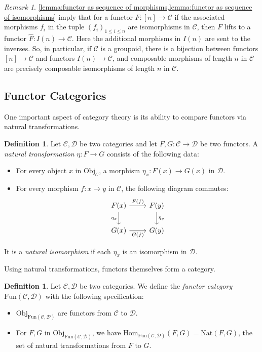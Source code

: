 \documentclass[11pt, a4paper]{amsart}
\newcommand{\cC}{\mathcal{C}}
\newcommand{\cD}{\mathcal{D}}
\newcommand{\Hom}{\mathrm{Hom}}
\newcommand{\Fun}{\mathrm{Fun}}
\newcommand{\Nat}{\mathrm{Nat}}
\newcommand{\Obj}{\mathrm{Obj}}
\theoremstyle{definition}
\newtheorem{definition}[equation]{Definition}
\theoremstyle{remark}
\newtheorem{remark}[equation]{Remark}
\numberwithin{equation}{section}
\begin{document}
\begin{remark} \label{rem:n to in lift}
  \cref{lemma:functor as sequence of morphisms,lemma:functor as sequence of isomorphisms} imply that for a functor $F\colon [n] \to \cC$ if the associated morphisms $f_i$ in the tuple $(f_i)_{1 \leq i \leq n}$ are isomorphisms in $\cC$, then $F$ lifts to a functor $\hat{F}\colon I(n) \to \cC$. Here the additional morphisms in $I(n)$ are sent to the inverses. 
  So, in particular, if $\cC$ is a groupoid, there is a bijection between functors $[n] \to \cC$ and functors $I(n) \to \cC$, and composable morphisms of length $n$ in $\cC$ are precisely composable isomorphisms of length $n$ in $\cC$.
\end{remark}

\subsection{Functor Categories}
One important aspect of category theory is its ability to compare functors via natural transformations.

\begin{definition}
	Let $\cC,\cD$ be two categories and let $F,G\colon \cC \to \cD$ be two functors. A \emph{natural transformation} $\eta\colon F \to G$ consists of the following data:
	\begin{itemize}
		\item For every object $x$ in $\Obj_{\cC}$, a morphism $\eta_x\colon F(x) \to G(x)$ in $\cD$.
		\item For every morphism $f\colon x \to y$ in $\cC$, the following diagram commutes:
		\[
		\begin{tikzcd}
		F(x) \arrow[r, "F(f)"] \arrow[d, "\eta_x"'] & F(y) \arrow[d, "\eta_y"] \\
		G(x) \arrow[r, "G(f)"'] & G(y)
		\end{tikzcd}
		\]
	\end{itemize}
  It is a \emph{natural isomorphism} if each $\eta_x$ is an isomorphism in $\cD$.
\end{definition}

Using natural transformations, functors themselves form a category.

\begin{definition} \label{def:functor category}
	Let $\cC,\cD$ be two categories. We define the \emph{functor category} $\Fun(\cC,\cD)$ with the following specification:
	\begin{itemize}
		\item $\Obj_{\Fun(\cC,\cD)}$ are functors from $\cC$ to $\cD$.
		\item For $F,G$ in $\Obj_{\Fun(\cC,\cD)}$, we have $\Hom_{\Fun(\cC,\cD)}(F,G) = \Nat(F,G)$, the set of natural transformations from $F$ to $G$.
	\end{itemize}
\end{definition}
\end{document}
